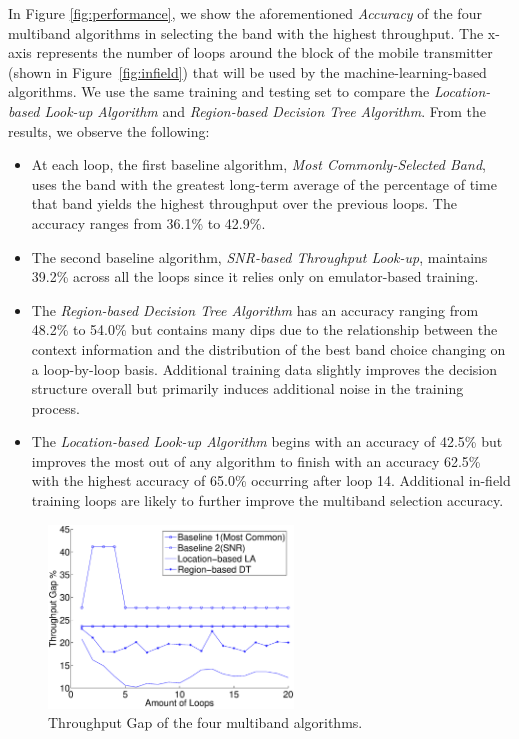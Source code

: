 In Figure \ref{fig:performance}, we show the aforementioned \emph{Accuracy}
of the four multiband algorithms in selecting the band with the highest
throughput. The x-axis represents the number of loops around the
block of the mobile transmitter (shown in 
Figure~\ref{fig:infield}) that will be used by the machine-learning-based
algorithms. We use the same training and testing set to compare 
the \emph{Location-based Look-up Algorithm} and \emph{Region-based
Decision Tree Algorithm}. From the results, we observe the following:

\begin{itemize}
\item
At each loop, the first baseline algorithm, \emph{Most Commonly-Selected
Band}, uses the band with the greatest long-term average of the percentage
of time that band yields the highest throughput over the previous loops.
The accuracy ranges from 36.1\% to 42.9\%.
\item
The second baseline algorithm, \emph{SNR-based Throughput Look-up},
maintains 39.2\% across all the loops since it relies only on 
emulator-based training.
\item 
The \emph{Region-based Decision Tree Algorithm} has an accuracy ranging
from 48.2\% to 54.0\% but contains many dips due to the relationship
between the context information and the distribution of the best band
choice changing on a loop-by-loop basis. Additional training data 
slightly improves the decision structure overall but primarily induces
additional noise in the training process.
\item 
The \emph{Location-based Look-up Algorithm} begins with an accuracy of
42.5\% but improves the most out of any algorithm to finish with an 
accuracy 62.5\% with the highest accuracy of 65.0\% occurring after loop 14.
Additional in-field training loops are likely to further improve the multiband
selection accuracy.
\end{itemize}

\begin{figure}
\vspace{-0.1in}
\centering
\includegraphics[width=65mm]{figures/performance_gap}
\vspace{-0.1in}
\caption{Throughput Gap of the four multiband algorithms.}
\label{fig:performance_gap}
\vspace{0.1in}
\end{figure}

